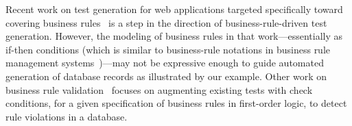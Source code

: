 Recent work on test generation for web applications targeted specifically toward
covering business rules~\cite{Thummalapenta:2013} is a step in the direction of
business-rule-driven test generation. However, the modeling of business rules in
that work---essentially as if-then conditions (which is similar to business-rule
notations in business rule management systems~\cite{drools,ilog})---may not be
expressive enough to guide automated generation of database records as
illustrated by our example. Other work on business rule
validation~\cite{Willmor:2006} focuses on augmenting existing tests with check
conditions, for a given specification of business rules in first-order logic, to
detect rule violations in a database.

%
